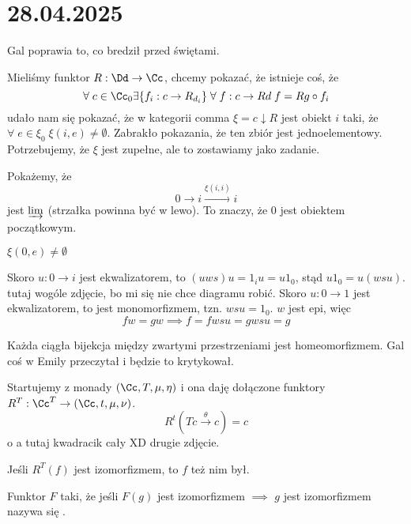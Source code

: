 \section{28.04.2025}

Gal poprawia to, co bredził przed świętami.

Mieliśmy funktor $R:\Dd\to\Cc$, chcemy pokazać, że istnieje coś, że
$$\forall\;c\in\Cc_0\exists\{f_i:c\to R_{d_i}\}\;\forall\;f:c\to Rd\;f=Rg\circ f_i$$
udało nam się pokazać, że w kategorii comma $\xi=c\downarrow R$ jest obiekt $i$ taki, że $\forall\;e\in\xi_0\;\xi(i,e)\neq\emptyset$. Zabrakło pokazania, że ten zbiór jest jednoelementowy. Potrzebujemy, że $\xi$ jest zupełne, ale to zostawiamy jako zadanie.

Pokażemy, że 
$$0\to i\xrightarrow{\xi(i,i)} i$$
jest $\varinjlim$ {\color{red}(strzałka powinna być w lewo)}. To znaczy, że $0$ jest obiektem początkowym.

$\xi(0,e)\neq \emptyset$


Skoro $u:0\to i$ jest ekwalizatorem, to $(uws)u=1_iu=u1_0$, stąd $u1_0=u(wsu)$. {\color{red}tutaj wogóle zdjęcie, bo mi się nie chce diagramu robić}. Skoro $u:0\to 1$ jest ekwalizatorem, to jest monomorfizmem, tzn. $wsu=1_0$. $w$ jest epi, więc
$$fw=gw\implies f=fwsu=gwsu=g$$

Każda ciągła bijekcja między zwartymi przestrzeniami jest homeomorfizmem. Gal coś w Emily przeczytał i będzie to krytykował.
\begin{fact}{}{}
  Startujemy z monady $(\Cc, T, \mu,\eta)$ i ona daję dołączone funktory $R^T:\Cc^T\to (\Cc, t, \mu, \nu)$. 
  $$R^t(Tc\xrightarrow{\theta}c)=c$$
  o a tutaj kwadracik cały XD drugie zdjęcie.

  Jeśli $R^T(f)$ jest izomorfizmem, to $f$ też nim był.
\end{fact}

\begin{definition}{}{}
  Funktor $F$ taki, że jeśli $F(g)$ jest izomorfizmem $\implies$ $g$ jest izomorfizmem nazywa się .
\end{definition}

